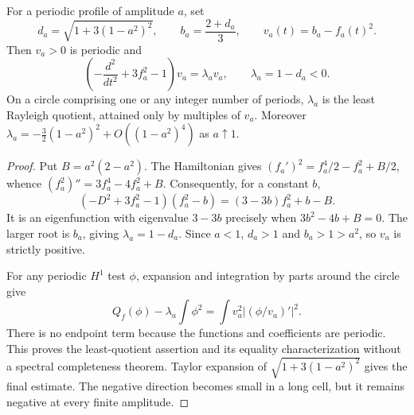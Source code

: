\begin{example}\label{ex:phase-periodic-negative-mode}
For a periodic profile of amplitude $a$, set
\[
 d_a=\sqrt{1+3(1-a^2)^2},\qquad
 b_a=\frac{2+d_a}{3},\qquad v_a(t)=b_a-f_a(t)^2.
\]
Then $v_a>0$ is periodic and
\[
 \left(-\frac{d^2}{dt^2}+3f_a^2-1\right)v_a
   =\lambda_a v_a,\qquad \lambda_a=1-d_a<0.
\]
On a circle comprising one or any integer number of periods, $\lambda_a$ is the least Rayleigh quotient, attained only by multiples of $v_a$. Moreover
$\lambda_a=-\tfrac32(1-a^2)^2+O((1-a^2)^4)$ as $a\uparrow1$.
\end{example}
\begin{proof}
Put $B=a^2(2-a^2)$. The Hamiltonian gives
$(f_a')^2=f_a^4/2-f_a^2+B/2$, whence
$(f_a^2)''=3f_a^4-4f_a^2+B$.
Consequently, for a constant $b$,
\[
 \left(-D^2+3f_a^2-1\right)(f_a^2-b)
       =(3-3b)f_a^2+b-B.
\]
It is an eigenfunction with eigenvalue $3-3b$ precisely when
$3b^2-4b+B=0$. The larger root is $b_a$, giving $\lambda_a=1-d_a$. Since $a<1$, $d_a>1$ and $b_a>1>a^2$, so $v_a$ is strictly positive.

For any periodic $H^1$ test $\phi$, expansion and integration by parts around the circle give
\[
 Q_f(\phi)-\lambda_a\int\phi^2
   =\int v_a^2\left|(\phi/v_a)'\right|^2.
\]
There is no endpoint term because the functions and coefficients are periodic. This proves the least-quotient assertion and its equality characterization without a spectral completeness theorem. Taylor expansion of $\sqrt{1+3(1-a^2)^2}$ gives the final estimate. The negative direction becomes small in a long cell, but it remains negative at every finite amplitude.
\end{proof}


